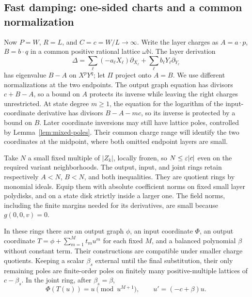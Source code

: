 \subsection{Fast damping: one-sided charts and a common normalization}

Now $P=W$, $R=L$, and $C=c=W/L\to\infty$. Write the layer
charges as $A=a\cdot p$, $B=b\cdot q$ in a common positive
rational lattice $\omega\mathbb N$. The layer derivation
\[
 \Delta=\sum_\ell(-a_\ell X_\ell)\partial_{X_\ell}
              +\sum_\ell b_\ell Y_\ell\partial_{Y_\ell}
\]
has eigenvalue $B-A$ on $X^pY^q$; let $\Pi$ project onto $A=B$.
We use different normalizations at the two endpoints. The output
graph equation has divisors $c+B-A$, so a bound on $A$ protects its
inverse while leaving the right charges unrestricted. At state degree
$m\geq1$, the equation for the logarithm of the input-coordinate derivative
has divisors $B-A-mc$, so its inverse is protected by a bound on $B$.
Later coordinate inversions may still have lattice poles, controlled
by Lemma~\ref{lem:mixed-poles}. Their common charge range will identify
the two coordinates at the midpoint, where both omitted endpoint layers
are small.

Take $N$ a small fixed multiple of $|Z_k|$, locally frozen, so
$N\leq\varepsilon|c|$ even on the required variant neighborhoods.
The output, input, and joint rings retain respectively $A<N$,
$B<N$, and both inequalities. They are quotient rings by monomial
ideals. Equip them with absolute coefficient norms on fixed small
layer polydisks, and on a state disk strictly inside a larger one.
The field norms, including the finite margins needed for its
derivatives, are small because $g(0,0,v)=0$.

\begin{lemma}\label{lem:mixed-charts}
In these rings there are an output graph $\phi$, an input
coordinate $\Phi$, an output coordinate
$T=\phi+\sum_{m=1}^Mt_m u^m$ for each fixed $M$, and a balanced
polynomial $\beta$ without constant term. Their constructions are
compatible under smaller charge quotients. Keeping a scalar
$\beta_s$ external until the final substitution, their only
remaining poles are finite-order poles on finitely many
positive-multiple lattices of $c-\beta_s$. In the joint ring,
after $\beta_s=\beta$,
\begin{equation}\label{eq:mixed-chart-identities}
 \Phi(T(u))=u\pmod{u^{M+1}},\qquad
 u'=(-c+\beta)u.
\end{equation}
\end{lemma}

